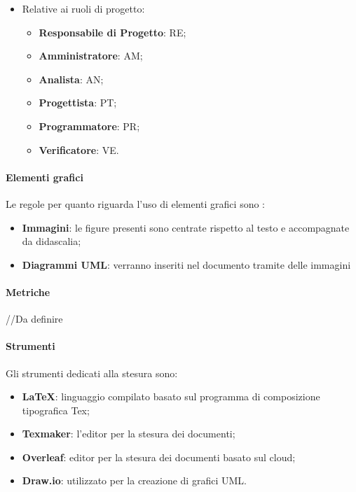 \begin{itemize}
\begin{itemize}
    \item Relative ai ruoli di progetto:
        \begin{itemize}
        \item \textbf{Responsabile di Progetto}: RE;
        \item \textbf{Amministratore}: AM;
        \item \textbf{Analista}: AN;
        \item \textbf{Progettista}: PT;
        \item \textbf{Programmatore}: PR;
        \item \textbf{Verificatore}: VE.
        \end{itemize}
    \end{itemize}
\end{itemize}

\paragraph{Elementi grafici}
Le regole per quanto riguarda l’uso di elementi grafici sono :
\begin{itemize}
\item \textbf{Immagini}: le figure presenti sono centrate rispetto al testo e accompagnate da didascalia;
\item \textbf{Diagrammi UML}: verranno inseriti nel documento tramite delle immagini
\end{itemize}

\paragraph{Metriche}
//Da definire

\paragraph{Strumenti}
Gli strumenti dedicati alla stesura sono:
\begin{itemize}
\item \textbf{\LaTeX}: linguaggio compilato basato sul programma di composizione tipografica Tex;
\item \textbf{Texmaker}: l’editor per la stesura dei documenti;
\item \textbf{Overleaf}: editor per la stesura dei documenti basato sul cloud;
\item \textbf{Draw.io}: utilizzato per la creazione di grafici UML. 
\end{itemize}

